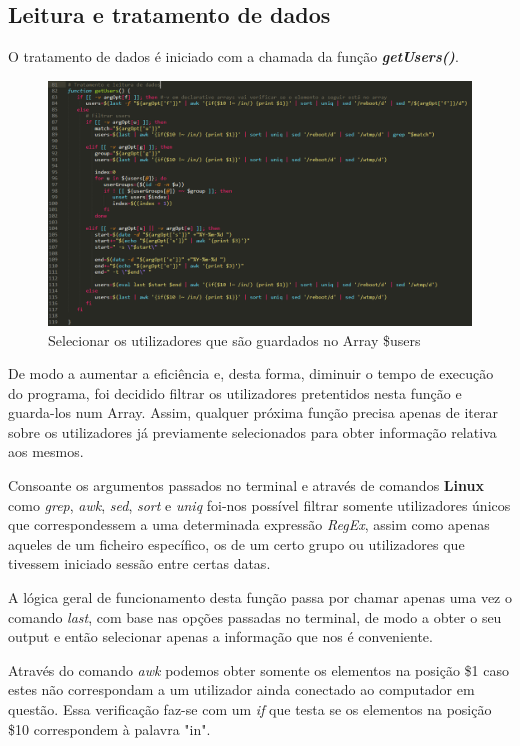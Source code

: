 \documentclass[10pt,portuguese]{article}
\begin{document}
\clearpage 

\subsection{Leitura e tratamento de dados}
\newline
\par O tratamento de dados é iniciado com a chamada da função \textbf{\textit{getUsers()}}.
\begin{figure}[!h]
    \centering
    \includegraphics[width=\textwidth]{getUsers.PNG}
    \caption{Selecionar os utilizadores que são guardados no Array \$users}
\end{figure}
\par De modo a aumentar a eficiência e, desta forma, diminuir o tempo de execução do programa, foi decidido filtrar os utilizadores pretentidos nesta função e guarda-los num Array. Assim, qualquer próxima função precisa apenas de iterar sobre os utilizadores já previamente selecionados para obter informação relativa aos mesmos.
\par Consoante os argumentos passados no terminal e através de comandos \textbf{Linux} como \textit{grep}, \textit{awk}, \textit{sed}, \textit{sort} e \textit{uniq} foi-nos possível filtrar somente utilizadores únicos que correspondessem a uma determinada expressão \textit{RegEx}, assim como apenas aqueles de um ficheiro específico, os de um certo grupo ou utilizadores que tivessem iniciado sessão entre certas datas.
\par A lógica geral de funcionamento desta função passa por chamar apenas uma vez o comando \textit{last}, com base nas opções passadas no terminal, de modo a obter o seu output e então selecionar apenas a informação que nos é conveniente.
\par Através do comando \textit{awk} podemos obter somente os elementos na posição \$1 caso estes não correspondam a um utilizador ainda conectado ao computador em questão. Essa verificação faz-se com um \textit{if} que testa se os elementos na posição \$10 correspondem à palavra "in".
\end{document}
